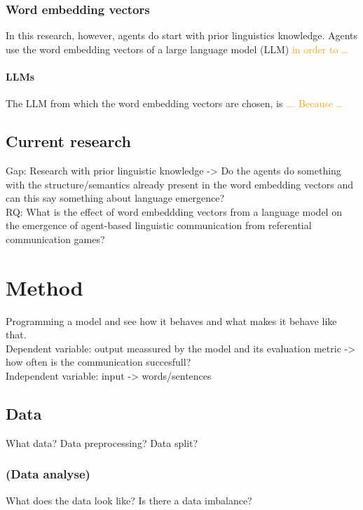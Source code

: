 \documentclass[a4paper, 12pt]{report}
\begin{document}
\subsection{Word embedding vectors}
In this research, however, agents do start with prior linguistics knowledge. 
Agents use the word embedding vectors of a large language model (LLM) \textcolor{orange}{in order to \dots}

\subsubsection{LLMs}
The LLM from which the word embedding vectors are chosen, is \textcolor{orange}{\dots. Because \dots}

\section{Current research}
Gap: Research with prior linguistic knowledge -> Do the agents do something with the structure/semantics already present in the word embedding vectors and can this say something about language emergence? \\
RQ: What is the effect of word embeddding vectors from a language model on the emergence of agent-based linguistic communication from referential communication games?


\chapter{Method}
Programming a model and see how it behaves and what makes it behave like that. \\
Dependent variable: output meassured by the model and its evaluation metric -> how often is the communication succesfull? \\
Independent variable: input -> words/sentences \\

\section{Data}
What data? Data preprocessing? Data split?

\subsection{(Data analyse)}
What does the data look like? Is there a data imbalance?
\end{document}
